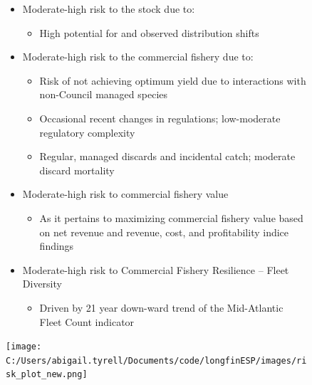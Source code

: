 \documentclass[
  8.5pt,
  letterpaper,
  DIV=11,
  numbers=noendperiod]{scrartcl}
\providecommand{\tightlist}{%
  \setlength{\itemsep}{0pt}\setlength{\parskip}{0pt}}\usepackage{longtable,booktabs,array}
\begin{document}
\begin{figure}
\begin{minipage}{0.40\linewidth}
\begin{itemize}
\tightlist
\item
  Moderate-high risk to the stock due to:

  \begin{itemize}
  \tightlist
  \item
    High potential for and observed distribution shifts\\
  \end{itemize}
\item
  Moderate-high risk to the commercial fishery due to:

  \begin{itemize}
  \tightlist
  \item
    Risk of not achieving optimum yield due to interactions with
    non-Council managed species
  \item
    Occasional recent changes in regulations; low-moderate regulatory
    complexity
  \item
    Regular, managed discards and incidental catch; moderate discard
    mortality
  \end{itemize}
\item
  Moderate-high risk to commercial fishery value

  \begin{itemize}
  \tightlist
  \item
    As it pertains to maximizing commercial fishery value based on net
    revenue and revenue, cost, and profitability indice findings
  \end{itemize}
\item
  Moderate-high risk to Commercial Fishery Resilience -- Fleet Diversity

  \begin{itemize}
  \tightlist
  \item
    Driven by 21 year down-ward trend of the Mid-Atlantic Fleet Count
    indicator
  \end{itemize}
\end{itemize}

\texttt{[image: C:/Users/abigail.tyrell/Documents/code/longfinESP/images/risk\_plot\_new.png]}

\end{minipage}%

\end{figure}%

\newpage
\end{document}

